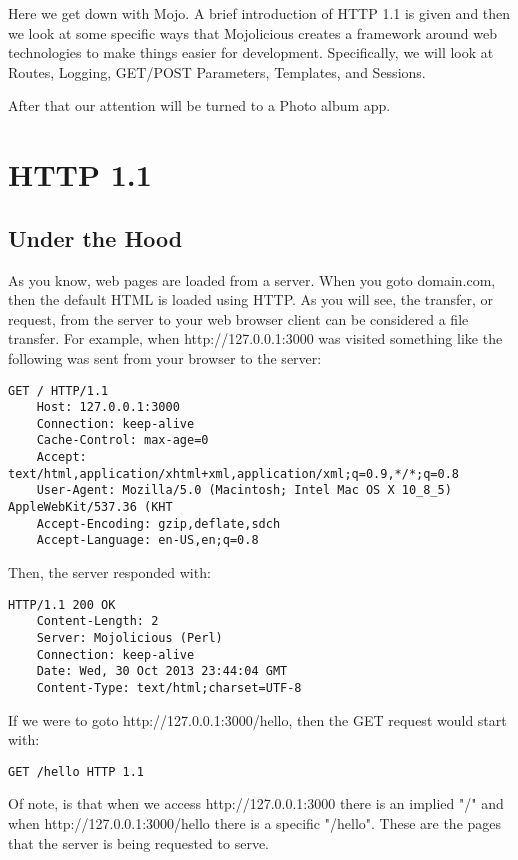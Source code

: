 \documentclass[17pt]{extreport}
\begin{document}
Here we get down with Mojo.  A brief introduction of HTTP 1.1 is given and then
we look at some specific ways that Mojolicious creates a framework around
web technologies to make things easier for development.  Specifically, we will look
at Routes, Logging, GET/POST Parameters, Templates, and Sessions.

After that our attention will be turned to a Photo album app.

\section{HTTP 1.1}

\subsection{Under the Hood}

As you know, web pages are loaded from a server. When you goto domain.com, then
the default HTML is loaded using HTTP.  As you will see, the transfer, or
request, from the server to your web browser client can be considered a file
transfer. For example, when http://127.0.0.1:3000 was visited something like
the following was sent from your browser to the server:

\begin{lstlisting}[style=BlockStyle]
    GET / HTTP/1.1
    Host: 127.0.0.1:3000
    Connection: keep-alive
    Cache-Control: max-age=0
    Accept: text/html,application/xhtml+xml,application/xml;q=0.9,*/*;q=0.8
    User-Agent: Mozilla/5.0 (Macintosh; Intel Mac OS X 10_8_5) AppleWebKit/537.36 (KHT
    Accept-Encoding: gzip,deflate,sdch
    Accept-Language: en-US,en;q=0.8
\end{lstlisting}

Then, the server responded with:

\begin{lstlisting}[style=BlockStyle]
    HTTP/1.1 200 OK
    Content-Length: 2
    Server: Mojolicious (Perl)
    Connection: keep-alive
    Date: Wed, 30 Oct 2013 23:44:04 GMT
    Content-Type: text/html;charset=UTF-8
\end{lstlisting}

If we were to goto http://127.0.0.1:3000/hello, then the GET request would
start with:

\begin{lstlisting}[style=BlockStyle]
    GET /hello HTTP 1.1
\end{lstlisting}

Of note, is that when we access http://127.0.0.1:3000 there is an implied "/"
and when http://127.0.0.1:3000/hello there is a specific "/hello".  These are
the pages that the server is being requested to serve.
\end{document}
